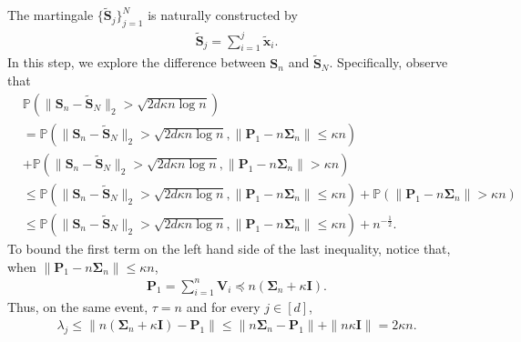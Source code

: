 The martingale $\{\tilde{\bm{S}}_j\}_{j=1}^N$ is naturally constructed by
\begin{align*}
\tilde{\bm{S}}_j = \sum_{i=1}^j \tilde{\bm{x}}_i.
\end{align*}
In this step, we explore the difference between $\bm{S}_n$ and $\tilde{\bm{S}}_N$. Specifically, observe that
\begin{align*}
&\mathbb{P}\left(\|\bm{S}_n - \tilde{\bm{S}}_{N}\|_2 > \sqrt{2d\kappa n\log n}\right) \\ 
&= \mathbb{P}(\|\bm{S}_n - \tilde{\bm{S}}_{N}\|_2 > \sqrt{2d\kappa n\log n}, \|\bm{P}_1 - n\bm{\Sigma}_n\| \leq \kappa n) \\ 
&+ \mathbb{P}(\|\bm{S}_n - \tilde{\bm{S}}_{N}\|_2 > \sqrt{2d\kappa n\log n}, \|\bm{P}_1 - n\bm{\Sigma}_n\| > \kappa n)  \\ 
&\leq \mathbb{P}(\|\bm{S}_n - \tilde{\bm{S}}_{N}\|_2 > \sqrt{2d\kappa n\log n}, \|\bm{P}_1 - n\bm{\Sigma}_n\| \leq \kappa n) + \mathbb{P}(\|\bm{P}_1 - n\bm{\Sigma}_n\| > \kappa n) \\ 
&\leq \mathbb{P}(\|\bm{S}_n - \tilde{\bm{S}}_{N}\|_2 > \sqrt{2d\kappa n\log n}, \|\bm{P}_1 - n\bm{\Sigma}_n\| \leq \kappa n ) + n^{-\frac{1}{2}}.
\end{align*}
To bound the first term on the left hand side of the last inequality, notice that, when $\|\bm{P}_1 - n\bm{\Sigma}_n\| \leq \kappa n$,
\begin{align*}
\bm{P}_1 = \sum_{i=1}^n \bm{V}_i \preceq n(\bm{\Sigma}_n + \kappa \bm{I}).
\end{align*}
Thus, on the same event, $\tau = n$ and for every $j \in [d]$, 
\begin{align*}
\lambda_j \leq \|n(\bm{\Sigma}_n + \kappa \bm{I}) - \bm{P}_1\| \leq \|n\bm{\Sigma}_n - \bm{P}_1\| + \|n\kappa \bm{I}\| = 2\kappa n.
\end{align*}

